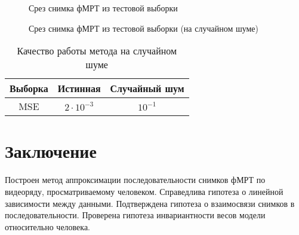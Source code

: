 \documentclass[a4paper, 12pt]{article}
\begin{document}
	\begin{figure}[h!]
		\centering
		\hfill
		\hfill
		\caption{Срез снимка фМРТ из тестовой выборки}
		\label{fig:7}
	\end{figure}

	\begin{figure}[h!]
		\centering
		\hfill
		\hfill
		\caption{Срез снимка фМРТ из тестовой выборки (на случайном шуме)}
		\label{fig:8}
	\end{figure}

	\begin{table}[h!]
		\centering
		\caption{Качество работы метода на случайном шуме}
		\begin{tabular}{|c|c|c|}
			\hline
			Выборка	&	Истинная	&	Случайный шум \\ \hline \hline
			MSE		& 	$2 \cdot 10^{-3}$	 &		$10^{-1}$ \\ \hline
		\end{tabular}
		\label{table:2}
	\end{table}

\newpage

\section{Заключение}

	Построен метод аппроксимации последовательности снимков фМРТ по видеоряду,
	просматриваемому человеком.
	Справедлива гипотеза о линейной зависимости между данными.
	Подтверждена гипотеза о взаимосвязи снимков в последовательности.
	Проверена гипотеза инвариантности весов модели относительно человека.

\newpage



\end{document}
